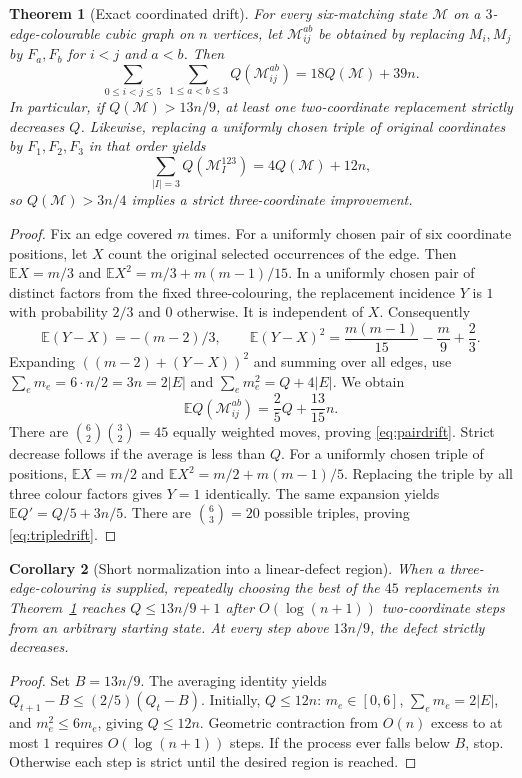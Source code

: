 \documentclass[11pt]{article}
\newtheorem{theorem}{Theorem}
\newtheorem{corollary}[theorem]{Corollary}
\newcommand{\M}{\mathcal M}
\begin{document}
\begin{theorem}[Exact coordinated drift]\label{thm:drift}
For every six-matching state $\M$ on a $3$-edge-colourable cubic graph on $n$ vertices, let $\M_{ij}^{ab}$ be obtained by replacing $M_i,M_j$ by $F_a,F_b$ for $i<j$ and $a<b$. Then
\begin{equation}\label{eq:pairdrift}
\sum_{0\le i<j\le5}\ \sum_{1\le a<b\le3} Q(\M_{ij}^{ab})=18Q(\M)+39n.
\end{equation}
In particular, if $Q(\M)>13n/9$, at least one two-coordinate replacement strictly decreases $Q$. Likewise, replacing a uniformly chosen triple of original coordinates by $F_1,F_2,F_3$ in that order yields
\begin{equation}\label{eq:tripledrift}
\sum_{|I|=3}Q(\M_{I}^{123})=4Q(\M)+12n,
\end{equation}
so $Q(\M)>3n/4$ implies a strict three-coordinate improvement.
\end{theorem}
\begin{proof}
Fix an edge covered $m$ times. For a uniformly chosen pair of six coordinate positions, let $X$ count the original selected occurrences of the edge. Then $\mathbb EX=m/3$ and $\mathbb EX^2=m/3+m(m-1)/15$. In a uniformly chosen pair of distinct factors from the fixed three-colouring, the replacement incidence $Y$ is $1$ with probability $2/3$ and $0$ otherwise. It is independent of $X$. Consequently
\[
\mathbb E(Y-X)=-(m-2)/3,\qquad
\mathbb E(Y-X)^2=\frac{m(m-1)}{15}-\frac m9+\frac23.
\]
Expanding $((m-2)+(Y-X))^2$ and summing over all edges, use $\sum_e m_e=6\cdot n/2=3n=2|E|$ and $\sum_e m_e^2=Q+4|E|$. We obtain
\[
\mathbb E Q(\M_{ij}^{ab})=\frac25Q+\frac{13}{15}n.
\]
There are $\binom62\binom32=45$ equally weighted moves, proving \eqref{eq:pairdrift}. Strict decrease follows if the average is less than $Q$.
For a uniformly chosen triple of positions, $\mathbb EX=m/2$ and $\mathbb EX^2=m/2+m(m-1)/5$. Replacing the triple by all three colour factors gives $Y=1$ identically. The same expansion yields $\mathbb E Q'=Q/5+3n/5$. There are $\binom63=20$ possible triples, proving \eqref{eq:tripledrift}.
\end{proof}

\begin{corollary}[Short normalization into a linear-defect region]
When a three-edge-colouring is supplied, repeatedly choosing the best of the $45$ replacements in Theorem~\ref{thm:drift} reaches $Q\le13n/9+1$ after $O(\log(n+1))$ two-coordinate steps from an arbitrary starting state. At every step above $13n/9$, the defect strictly decreases.
\end{corollary}
\begin{proof}
Set $B=13n/9$. The averaging identity yields $Q_{t+1}-B\le (2/5)(Q_t-B)$. Initially, $Q\le12n$: $m_e\in[0,6]$, $\sum_em_e=2|E|$, and $m_e^2\le6m_e$, giving $Q\le 12n$. Geometric contraction from $O(n)$ excess to at most $1$ requires $O(\log(n+1))$ steps. If the process ever falls below $B$, stop. Otherwise each step is strict until the desired region is reached.
\end{proof}
\end{document}
